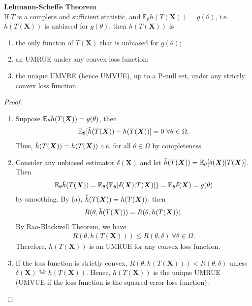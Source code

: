 \begin{theorem}
    \textbf{Lehmann-Scheff$\bm{\acute{e}}$ Theorem}\\
    If $T$ is a complete and sufficient statistic, and $\mathbb{E}_\theta h(T(\boldsymbol{X}))=g(\theta)$,
    i.e. $h(T(\boldsymbol{X}))$ is unbiased for $g(\theta)$,
    then $h(T(\boldsymbol{X}))$ is
    \begin{enumerate}[{(a)}]
        \item the only functon of $T(\boldsymbol{X})$ that is unbiased for $g(\theta)$;
        \item an UMRUE under any convex loss function;
        \item the unique UMVRE (hence UMVUE), up to a P-null set, 
        under any strictly convex loss function.
    \end{enumerate}
\end{theorem}
\begin{proof}
    $~$
    \begin{enumerate}[{(a)}]
        \item Suppose $\mathbb{E}_\theta\Tilde{h}(T(\boldsymbol{X}))=g(\theta)$, then
        \begin{gather}
            \mathbb{E}_\theta[\Tilde{h}(T(\boldsymbol{X}))-h(T(\boldsymbol{X}))]=0~\forall{\theta}\in\Omega.
        \end{gather}
        Thus, $\Tilde{h}(T(\boldsymbol{X}))=h(T(\boldsymbol{X}))$ a.s. 
        for all $\theta\in\Omega$ by completeness.
        \item Consider any unbiased estimator $\delta(\boldsymbol{X})$ and 
        let $\Tilde{h}(T(\boldsymbol{X}))=\mathbb{E}_\theta[\delta(\boldsymbol{X})|T(\boldsymbol{X})]$. Then
        \begin{gather}
            \mathbb{E}_\theta\Tilde{h}(T(\boldsymbol{X}))
            =\mathbb{E}_\theta\{\mathbb{E}_\theta[\delta(\boldsymbol{X})|T(\boldsymbol{X})]\}
            =\mathbb{E}_\theta\delta(\boldsymbol{X})=g(\theta)
        \end{gather}
        by smoothing. By (a), $\Tilde{h}(T(\boldsymbol{X}))=h(T(\boldsymbol{X}))$, then
        \begin{gather}
            R(\theta,\Tilde{h}(T(\boldsymbol{X})))=R(\theta,h(T(\boldsymbol{X}))).
        \end{gather}
        By Rao-Blackwell Theorem, we have 
        \begin{gather}
            R(\theta,h(T(\boldsymbol{X})))\leq R(\theta,\delta)~\forall{\theta}\in\Omega.
        \end{gather}
        Therefore, $h(T(\boldsymbol{X}))$ is an UMRUE for any convex loss function.
        \item If the loss function is strictly convex, 
        $R(\theta,h(T(\boldsymbol{X})))< R(\theta,\delta)$
        unless $\delta(\boldsymbol{X})\overset{a.s.}{=}h(T(\boldsymbol{X}))$. 
        Hence, $h(T(\boldsymbol{X}))$ is the unique UMRUE
        (UMVUE if the loss function is the squared error loss function).
    \end{enumerate}
\end{proof}

